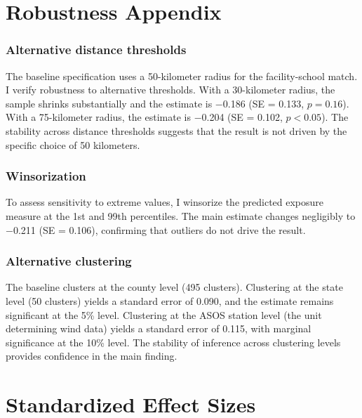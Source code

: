 \documentclass[12pt]{article}
\begin{document}
\section{Robustness Appendix}

\subsubsection*{Alternative distance thresholds} The baseline specification uses a 50-kilometer radius for the facility-school match. I verify robustness to alternative thresholds. With a 30-kilometer radius, the sample shrinks substantially and the estimate is $-$0.186 (SE = 0.133, $p = 0.16$). With a 75-kilometer radius, the estimate is $-$0.204 (SE = 0.102, $p < 0.05$). The stability across distance thresholds suggests that the result is not driven by the specific choice of 50 kilometers.

\subsubsection*{Winsorization} To assess sensitivity to extreme values, I winsorize the predicted exposure measure at the 1st and 99th percentiles. The main estimate changes negligibly to $-$0.211 (SE = 0.106), confirming that outliers do not drive the result.

\subsubsection*{Alternative clustering} The baseline clusters at the county level (495 clusters). Clustering at the state level (50 clusters) yields a standard error of 0.090, and the estimate remains significant at the 5\% level. Clustering at the ASOS station level (the unit determining wind data) yields a standard error of 0.115, with marginal significance at the 10\% level. The stability of inference across clustering levels provides confidence in the main finding.

\section{Standardized Effect Sizes}
\label{sec:sde}


\end{document}
